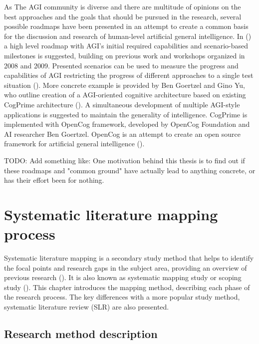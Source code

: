 \documentclass[utf8,english]{gradu3}
\begin{document}
As The AGI community is diverse and there are multitude of opinions on the best
approaches and the goals that should be pursued in the research, several
possible roadmaps have been presented in an attempt to create a common basis for
the discussion and research of human-level artificial general intelligence. In
(\cite{adams2012}) a high level roadmap with AGI's initial required capabilities
and scenario-based milestones is suggested, building on previous work and
workshops organized in 2008 and 2009. Presented scenarios can be used to measure
the progress and capabilities of AGI restricting the progress of different
approaches to a single test situation (\cite{adams2012}). More concrete example
is provided by Ben Goertzel and Gino Yu, who outline creation of a AGI-oriented
cognitive architecture based on existing CogPrime architecture
(\cite{goertzel2014map}). A simultaneous development of multiple AGI-style
applications is suggested to maintain the generality of intelligence. CogPrime
is implemented with OpenCog framework, developed by OpenCog Foundation and AI
researcher Ben Goertzel. OpenCog is an attempt to create an open source
framework for artificial general intelligence
(\cite{opencogwiki,goertzel2012cog}).

TODO: Add something like: One motivation behind this thesis is to find out if
these roadmaps and "common ground" have actually lead to anything concrete, or
has their effort been for nothing.


\chapter{Systematic literature mapping process}


\label{method}

Systematic literature mapping is a secondary study method that helps to identify
the focal points and research gaps in the subject area, providing an overview of
previous research (\cite{petersen2008}). It is also known as systematic mapping
study or scoping study (\cite{keele2007}). This chapter introduces the mapping
method, describing each phase of the research process. The key differences with
a more popular study method, systematic literature review (SLR) are also
presented.

\section{Research method description}
\end{document}
